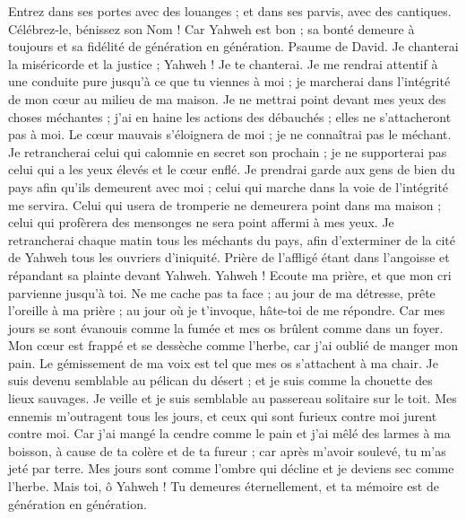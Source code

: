 \begin{multicols}{2}
Entrez dans ses portes avec des louanges ; et dans ses parvis, avec des cantiques. Célébrez-le, bénissez son Nom !
Car Yahweh est bon ; sa bonté demeure à toujours et sa fidélité de génération en génération.
\VerseOne{}Psaume de David. Je chanterai la miséricorde et la justice ; Yahweh ! Je te chanterai.
Je me rendrai attentif à une conduite pure jusqu’à ce que tu viennes à moi ; je marcherai dans l'intégrité de mon cœur au milieu de ma maison.
Je ne mettrai point devant mes yeux des choses méchantes ; j'ai en haine les actions des débauchés ; elles ne s’attacheront pas à moi.
Le cœur mauvais s’éloignera de moi ; je ne connaîtrai pas le méchant.
Je retrancherai celui qui calomnie en secret son prochain ; je ne supporterai pas celui qui a les yeux élevés et le cœur enflé.
Je prendrai garde aux gens de bien du pays afin qu'ils demeurent avec moi ; celui qui marche dans la voie de l’intégrité me servira.
Celui qui usera de tromperie ne demeurera point dans ma maison ; celui qui profèrera des mensonges ne sera point affermi à mes yeux.
Je retrancherai chaque matin tous les méchants du pays, afin d'exterminer de la cité de Yahweh tous les ouvriers d'iniquité.
\VerseOne{}Prière de l'affligé étant dans l'angoisse et répandant sa plainte devant Yahweh.
Yahweh ! Ecoute ma prière, et que mon cri parvienne jusqu’à toi.
Ne me cache pas ta face ; au jour de ma détresse, prête l'oreille à ma prière ; au jour où je t'invoque, hâte-toi de me répondre.
Car mes jours se sont évanouis comme la fumée et mes os brûlent comme dans un foyer.
Mon cœur est frappé et se dessèche comme l'herbe, car j'ai oublié de manger mon pain.
Le gémissement de ma voix est tel que mes os s’attachent à ma chair.
Je suis devenu semblable au pélican du désert ; et je suis comme la chouette des lieux sauvages.
Je veille et je suis semblable au passereau solitaire sur le toit.
Mes ennemis m’outragent tous les jours, et ceux qui sont furieux contre moi jurent contre moi.
Car j'ai mangé la cendre comme le pain et j'ai mêlé des larmes à ma boisson,
à cause de ta colère et de ta fureur ; car après m'avoir soulevé, tu m'as jeté par terre.
Mes jours sont comme l'ombre qui décline et je deviens sec comme l'herbe.
Mais toi, ô Yahweh ! Tu demeures éternellement, et ta mémoire est de génération en génération.

\end{multicols}
